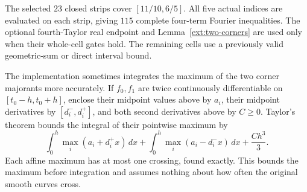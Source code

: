 The selected $23$ closed strips cover $[11/10,6/5]$. All five
actual indices are evaluated on each strip, giving $115$ complete
four-term Fourier inequalities. The optional fourth-Taylor real
endpoint and Lemma~\ref{ext:two-corners} are used only when their
whole-cell gates hold. The remaining cells use a previously valid
geometric-sum or direct interval bound.

The implementation sometimes integrates the maximum of the two
corner majorants more accurately. If $f_0,f_1$ are twice continuously
differentiable on $[t_0-h,t_0+h]$, enclose their midpoint values above
by $a_i$, their midpoint derivatives by $[d_i^-,d_i^+]$, and both
second derivatives above by $C\ge0$. Taylor's theorem bounds the
integral of their pointwise maximum by
\[
 \int_0^h\max_i(a_i+d_i^+x)\,dx
 +\int_0^h\max_i(a_i-d_i^-x)\,dx+\frac{Ch^3}{3}.
\]
Each affine maximum has at most one crossing, found exactly. This
bounds the maximum before integration and assumes nothing about
how often the original smooth curves cross.

